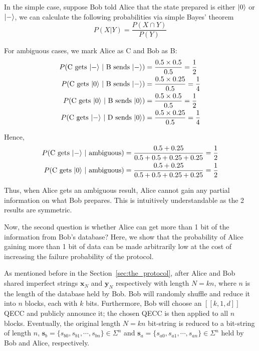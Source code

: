 \documentclass[%
 reprint,
superscriptaddress,
 amsmath,amssymb,
 aps,
]{revtex4-2}
\begin{document}
In the simple case, suppose Bob told Alice that the state prepared is either $\ket{0}$ or $\ket{-}$, we can calculate the following probabilities via simple Bayes' theorem 
\begin{equation}
    P(X|Y) = \frac{P(X \cap Y)}{P(Y)}
\end{equation}

For ambiguous cases, we mark Alice as C and Bob as B:
\begin{equation}
    \begin{split}
        P(\text{C gets $\ket{-}$ $|$ B sends $\ket{-}$})&=\frac{0.5\times 0.5}{0.5}=\frac{1}{2}\\
        P(\text{C gets $\ket{0}$ $|$ B sends $\ket{-}$})&=\frac{0.5\times 0.25}{0.5}=\frac{1}{4}\\
        P(\text{C gets $\ket{0}$ $|$ B sends $\ket{0}$})&=\frac{0.5\times 0.5}{0.5}=\frac{1}{2}\\
        P(\text{C gets $\ket{-}$ $|$ D sends $\ket{0}$})&=\frac{0.5\times 0.25}{0.5}=\frac{1}{4}\\
    \end{split}
\end{equation}

Hence, 
\begin{equation}
    \begin{split}
        P(\text{C gets $\ket{-}$ $|$ ambiguous})&=\frac{0.5+0.25}{0.5+0.5+0.25+0.25}=\frac{1}{2}\\
        P(\text{C gets $\ket{0}$ $|$ ambiguous})&=\frac{0.5+0.25}{0.5+0.5+0.25+0.25}=\frac{1}{2}\\
    \end{split}
\end{equation}

Thus, when Alice gets an ambiguous result, Alice cannot gain any partial information on what Bob prepares. This is intuitively understandable as the 2 results are symmetric. 

Now, the second question is whether Alice can get more than 1 bit of the information from Bob's database? Here, we show that the probability of Alice gaining more than 1 bit of data can be made arbitrarily low at the cost of increasing the failure probability of the protocol.

As mentioned before in the Section~\ref{sec:the_protocol}, after Alice and Bob shared imperfect strings $\textbf{x}_N$ and $\textbf{y}_N$ respectively with length $N=kn$, where $n$ is the length of the database held by Bob. Bob will randomly shuffle and reduce it into $n$ blocks, each with $k$ bits. Furthermore, Bob will choose an $[[k, 1, d]]$ QECC and publicly announce it; the chosen QECC is then applied to all $n$ blocks. Eventually, the original length $N=kn$ bit-string is reduced to a bit-string of length $n$, $\textbf{s}_b=\{s_{b0}, s_{b1}, \cdots, s_{bn}\}\in\Sigma^n$ and $\textbf{s}_a=\{s_{a0}, s_{a1}, \cdots, s_{an}\}\in\Sigma^n$ held by Bob and Alice, respectively. 
\end{document}
